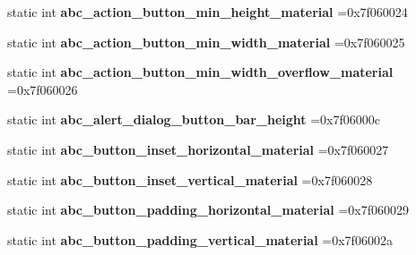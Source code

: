 \begin{DoxyCompactItemize}
static int {\bfseries abc\+\_\+action\+\_\+button\+\_\+min\+\_\+height\+\_\+material} =0x7f060024
\item 
\mbox{\label{classandroid_1_1support_1_1v7_1_1appcompat_1_1R_1_1dimen_a84258673bd6a72aef0272a8a75603041}} 
static int {\bfseries abc\+\_\+action\+\_\+button\+\_\+min\+\_\+width\+\_\+material} =0x7f060025
\item 
\mbox{\label{classandroid_1_1support_1_1v7_1_1appcompat_1_1R_1_1dimen_a2a29f60af289d3000936cd763e43dcba}} 
static int {\bfseries abc\+\_\+action\+\_\+button\+\_\+min\+\_\+width\+\_\+overflow\+\_\+material} =0x7f060026
\item 
\mbox{\label{classandroid_1_1support_1_1v7_1_1appcompat_1_1R_1_1dimen_acb828dbc2a57af9ff40d5a83602d8909}} 
static int {\bfseries abc\+\_\+alert\+\_\+dialog\+\_\+button\+\_\+bar\+\_\+height} =0x7f06000c
\item 
\mbox{\label{classandroid_1_1support_1_1v7_1_1appcompat_1_1R_1_1dimen_a5b254de1937d1d099b0ed9eddbe824f2}} 
static int {\bfseries abc\+\_\+button\+\_\+inset\+\_\+horizontal\+\_\+material} =0x7f060027
\item 
\mbox{\label{classandroid_1_1support_1_1v7_1_1appcompat_1_1R_1_1dimen_a7fd6e9dca2d733f22c06e51318a3c1e4}} 
static int {\bfseries abc\+\_\+button\+\_\+inset\+\_\+vertical\+\_\+material} =0x7f060028
\item 
\mbox{\label{classandroid_1_1support_1_1v7_1_1appcompat_1_1R_1_1dimen_a00b8f2be39e455488713fa84e0e78e2e}} 
static int {\bfseries abc\+\_\+button\+\_\+padding\+\_\+horizontal\+\_\+material} =0x7f060029
\item 
\mbox{\label{classandroid_1_1support_1_1v7_1_1appcompat_1_1R_1_1dimen_a172bd2b4551d469c3058c7e5651c84e9}} 
static int {\bfseries abc\+\_\+button\+\_\+padding\+\_\+vertical\+\_\+material} =0x7f06002a
\item 

\end{DoxyCompactItemize}
